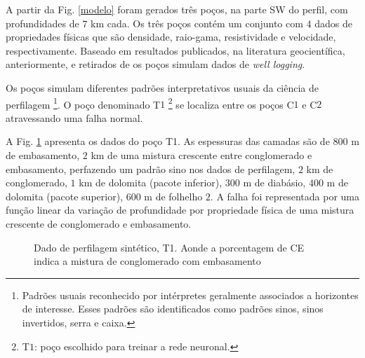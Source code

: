 A partir da Fig. \ref{modelo} foram gerados três poços, na parte SW do perfil, com profundidades de $7$ km cada. Os três poços contém um conjunto com $4$ dados de propriedades físicas que são densidade, raio-gama, resistividade e velocidade, respectivamente. Baseado em resultados publicados, na literatura geocientífica, anteriormente, e retirados de \citet{Telford_1993} os poços simulam dados de \textit{well logging}.

Os poços simulam diferentes padrões interpretativos usuais da ciência de perfilagem \footnote{Padrões usuais reconhecido por intérpretes geralmente associados a horizontes de interesse. Esses padrões são identificados como padrões sinos, sinos invertidos, serra e caixa.}. O poço denominado T$1$ \footnote{T$1$: poço escolhido para treinar a rede neuronal.} se localiza entre os poços C$1$ e C$2$ atravessando uma falha normal. 

A Fig. \ref{T1} apresenta os dados do poço T1. As espessuras das camadas são de $800$ m de embasamento, $2$ km de uma mistura crescente entre conglomerado e embasamento, perfazendo um padrão sino nos dados de perfilagem, $2$ km de conglomerado, $1$ km de dolomita (pacote inferior), $300$ m de diabásio, $400$ m de dolomita (pacote superior), $600$ m de folhelho $2$. A falha foi representada por uma função linear da variação de profundidade por propriedade física de uma mistura crescente de conglomerado e embasamento.

\begin{figure}[H]
	\centering
	\setlength{\fboxsep}{8pt}
	\setlength{\fboxrule}{0.1pt}
	\caption{Dado de perfilagem sintético, T1. Aonde a porcentagem de CE indica a mistura de conglomerado com embasamento}
	\label{T1}
\end{figure}


